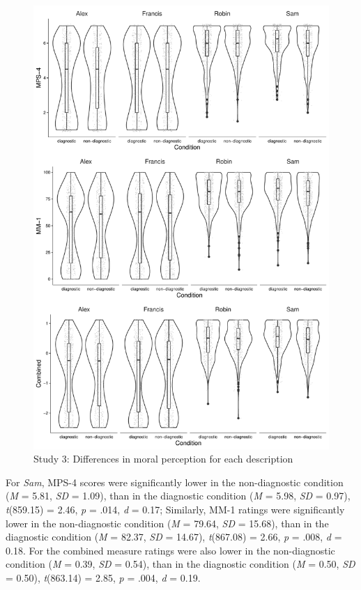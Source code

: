 \documentclass[
  american,
  man,floatsintext]{apa7}
\begin{document}
\begin{figure}[!p]
\includegraphics{Supplementary_files/figure-latex/S3allscenariosPlot-1} \caption{Study 3: Differences in moral perception for each description}\label{fig:S3allscenariosPlot}
\end{figure}

For \emph{Sam}, MPS-4 scores were significantly lower in the non-diagnostic condition (\emph{M} = 5.81, \emph{SD} = 1.09), than in the diagnostic condition (\emph{M} = 5.98, \emph{SD} = 0.97), \emph{t}(859.15) = 2.46, \emph{p} = .014, \emph{d} = 0.17; Similarly, MM-1 ratings were significantly lower in the non-diagnostic condition (\emph{M} = 79.64, \emph{SD} = 15.68), than in the diagnostic condition (\emph{M} = 82.37, \emph{SD} = 14.67), \emph{t}(867.08) = 2.66, \emph{p} = .008, \emph{d} = 0.18. For the combined measure ratings were also lower in the non-diagnostic condition (\emph{M} = 0.39, \emph{SD} = 0.54), than in the diagnostic condition (\emph{M} = 0.50, \emph{SD} = 0.50), \emph{t}(863.14) = 2.85, \emph{p} = .004, \emph{d} = 0.19.
\end{document}

